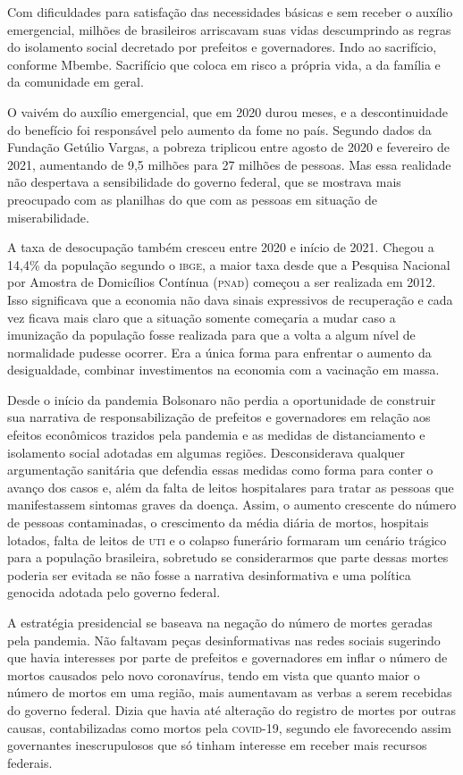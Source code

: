 Com dificuldades para satisfação das necessidades básicas e sem receber
o auxílio emergencial, milhões de brasileiros arriscavam suas vidas
descumprindo as regras do isolamento social decretado por prefeitos e
governadores. Indo ao sacrifício, conforme Mbembe. Sacrifício que coloca
em risco a própria vida, a da família e da comunidade em geral.

O vaivém do auxílio emergencial, que em 2020 durou meses, e a
descontinuidade do benefício foi responsável pelo aumento da fome no
país. Segundo dados da Fundação Getúlio Vargas, a pobreza triplicou
entre agosto de 2020 e fevereiro de 2021, aumentando de 9,5 milhões para
27 milhões de pessoas. Mas essa realidade não despertava a sensibilidade
do governo federal, que se mostrava mais preocupado com as planilhas do
que com as pessoas em situação de miserabilidade.

A taxa de desocupação também cresceu entre 2020 e início de 2021. Chegou
a 14,4\% da população segundo o \textsc{ibge}, a maior taxa desde que a Pesquisa
Nacional por Amostra de Domicílios Contínua (\textsc{pnad}) começou a ser
realizada em 2012. Isso significava que a economia não dava sinais
expressivos de recuperação e cada vez ficava mais claro que a situação
somente começaria a mudar caso a imunização da população fosse realizada
para que a volta a algum nível de normalidade pudesse ocorrer. Era a
única forma para enfrentar o aumento da desigualdade, combinar
investimentos na economia com a vacinação em massa.

Desde o início da pandemia Bolsonaro não perdia a oportunidade de
construir sua narrativa de responsabilização de prefeitos e governadores
em relação aos efeitos econômicos trazidos pela pandemia e as medidas de
distanciamento e isolamento social adotadas em algumas regiões.
Desconsiderava qualquer argumentação sanitária que defendia essas
medidas como forma para conter o avanço dos casos e, além da falta de
leitos hospitalares para tratar as pessoas que manifestassem sintomas
graves da doença. Assim, o aumento crescente do número de pessoas
contaminadas, o crescimento da média diária de mortos, hospitais
lotados, falta de leitos de \textsc{uti} e o colapso funerário formaram um
cenário trágico para a população brasileira, sobretudo se considerarmos
que parte dessas mortes poderia ser evitada se não fosse a narrativa
desinformativa e uma política genocida adotada pelo governo federal.

A estratégia presidencial se baseava na negação do número de mortes
geradas pela pandemia. Não faltavam peças desinformativas nas redes
sociais sugerindo que havia interesses por parte de prefeitos e
governadores em inflar o número de mortos causados pelo novo
coronavírus, tendo em vista que quanto maior o número de mortos em uma
região, mais aumentavam as verbas a serem recebidas do governo federal.
Dizia que havia até alteração do registro de mortes por outras causas,
contabilizadas como mortos pela \textsc{covid-19}, segundo ele favorecendo assim
governantes inescrupulosos que só tinham interesse em receber mais
recursos federais.

